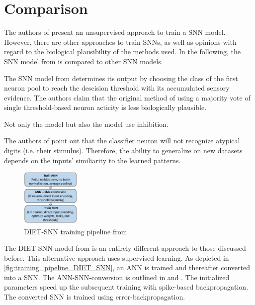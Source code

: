 \section{Comparison}
\label{sec:comparison}

The authors of \cite{SNN}  present an unsupervised approach to train a \ac{SNN} model.
However, there are other approaches to train \acp{SNN}, as well as opinions with regard to the biological plausibility of the methods used.
In the following, the \ac{SNN} model from \cite{SNN} is compared to other \ac{SNN} models.


The \ac{SNN} model from \cite{STDP_like} determines its output by 
choosing the class of the first neuron pool to reach the descision threshold with its accumulated sensory evidence.
The authors claim that the original method of using a majority vote of single threshold-based neuron acticity is less biologically plausible.

Not only the \cite{STDP_like} model but also the \cite{SNN} model use inhibition.

The authors of \cite{STDP_like} point out that the classifier neuron will not recognize atypical digits (i.e. their stimulus).
Therefore, the ability to generalize on new datasets depends on the inputs' similiarity to the learned patterns.



\begin{figure}
    \centering
    \vspace{-20pt}
    \includegraphics[width=0.25\textwidth]{pictures/DIET_SNN_pipeline.jpg}
    \caption{\acs{DIET}-\ac{SNN} training pipeline from \cite{DIET_SNN}}
    \label{fig:training_pipeline_DIET_SNN}
\end{figure}

The \ac{DIET}-\ac{SNN} model from \cite{DIET_SNN} is an entirely different approach to those discussed before.
This alternative approach uses supervised learning.
As depicted in \autoref{fig:training_pipeline_DIET_SNN}, an \ac{ANN} is trained and thereafter converted into a \ac{SNN}.
The \ac{ANN}-\ac{SNN}-conversion is outlined in \cite{DIET_SNN} and \cite{ANN_SNN_conversion}.
The initialized parameters speed up the subsequent training with spike-based backpropagation.
The converted \ac{SNN} is trained using error-backpropagation.


